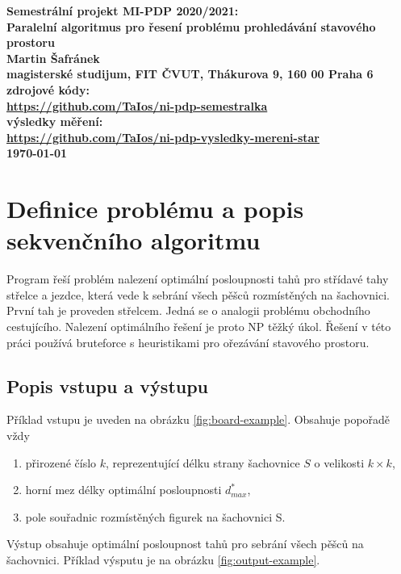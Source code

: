 \documentclass{article}
\begin{document}
    \begin{center}
        \bf Semestrální projekt MI-PDP 2020/2021:\\[5mm]
        Paralelní algoritmus pro řesení problému prohledávání stavového prostoru\\[5mm]
        Martin Šafránek\\[2mm]
        magisterské studijum, FIT ČVUT, Thákurova 9, 160 00 Praha 6\\[2mm]
        zdrojové kódy:\\ \url{https://github.com/TaIos/ni-pdp-semestralka}\\[2mm]
        výsledky měření:\\ \url{https://github.com/TaIos/ni-pdp-vysledky-mereni-star}\\[2mm]
        \today
    \end{center}


    \section{Definice problému a popis sekvenčního algoritmu}
    \label{sec:sequential1}

    Program řeší problém nalezení optimální posloupnosti tahů pro střídavé tahy střelce a jezdce, která vede k sebrání
    všech pěšců rozmístěných na šachovnici. První tah je proveden střelcem. Jedná se o analogii problému obchodního cestujícího.
    Nalezení optimálního řešení je proto NP těžký úkol. Řešení v této práci používá bruteforce
    s heuristikami pro ořezávání stavového prostoru.
    \newline

    \label{subsec:popis-vstupu-vystupu}
    \subsection{Popis vstupu a výstupu}
    Příklad vstupu je uveden na obrázku \ref{fig:board-example}. Obsahuje popořadě vždy
    \begin{enumerate}
        \item přirozené číslo $k$, reprezentující délku strany šachovnice $S$ o velikosti $k \times k$,
        \item horní mez délky optimální posloupnosti $d^{*}_{max}$,
        \item pole souřadnic rozmístěných figurek na šachovnici S.
    \end{enumerate}
    Výstup obsahuje optimální posloupnost tahů pro sebrání všech pěšců na šachovnici. Příklad výsputu je na obrázku  \ref{fig:output-example}.
\end{document}
